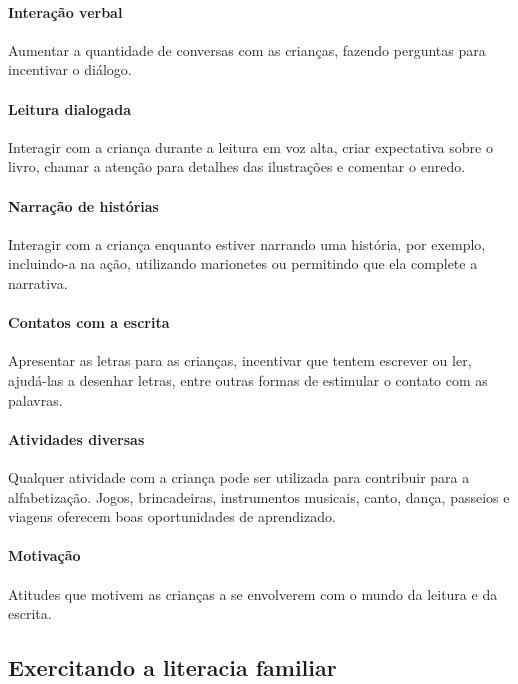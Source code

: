 \documentclass[11pt]{extarticle}
\begin{document}
\paragraph{Interação verbal} Aumentar a quantidade de conversas com as 
crianças, fazendo perguntas para incentivar o diálogo.

\paragraph{Leitura dialogada} Interagir com a criança durante a leitura 
em voz alta, criar expectativa sobre o livro, chamar a atenção para detalhes 
das ilustrações e comentar o enredo.

\paragraph{Narração de histórias} Interagir com a criança enquanto 
estiver narrando uma história, por exemplo, incluindo-a na ação, utilizando 
marionetes ou permitindo que ela complete a narrativa.

\paragraph{Contatos com a escrita} Apresentar as letras para as 
crianças, incentivar que tentem escrever ou ler, ajudá-las a desenhar letras, 
entre outras formas de estimular o contato com as palavras.

\paragraph{Atividades diversas} Qualquer atividade com a criança 
pode ser utilizada para contribuir para a alfabetização. Jogos, brincadeiras, 
instrumentos musicais, canto, dança, passeios e viagens oferecem boas 
oportunidades de aprendizado.

\paragraph{Motivação} Atitudes que motivem as crianças a se envolverem com 
o mundo da leitura e da escrita.

\subsection{Exercitando a literacia familiar}

\end{document}
